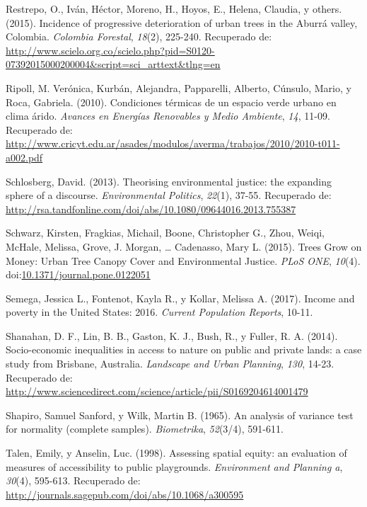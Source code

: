 \documentclass[12pt,a4paper,openany]{book}
\theoremstyle{definition}
\theoremstyle{definition}
\theoremstyle{definition}
\theoremstyle{remark}
\begin{document}
\hypertarget{ref-restrepo_incidence_2015}{}
Restrepo, O., Iván, Héctor, Moreno, H., Hoyos, E., Helena, Claudia, y
others. (2015). Incidence of progressive deterioration of urban trees in
the Aburrá valley, Colombia. \emph{Colombia Forestal}, \emph{18}(2),
225-240. Recuperado de:
\url{http://www.scielo.org.co/scielo.php?pid=S0120-07392015000200004\&script=sci_arttext\&tlng=en}

\hypertarget{ref-ripoll_condiciones_2010}{}
Ripoll, M. Verónica, Kurbán, Alejandra, Papparelli, Alberto, Cúnsulo,
Mario, y Roca, Gabriela. (2010). Condiciones térmicas de un espacio
verde urbano en clima árido. \emph{Avances en Energías Renovables y
Medio Ambiente}, \emph{14}, 11-09. Recuperado de:
\url{http://www.cricyt.edu.ar/asades/modulos/averma/trabajos/2010/2010-t011-a002.pdf}

\hypertarget{ref-schlosberg_theorising_2013}{}
Schlosberg, David. (2013). Theorising environmental justice: the
expanding sphere of a discourse. \emph{Environmental Politics},
\emph{22}(1), 37-55. Recuperado de:
\url{http://rsa.tandfonline.com/doi/abs/10.1080/09644016.2013.755387}

\hypertarget{ref-schwarz_trees_2015}{}
Schwarz, Kirsten, Fragkias, Michail, Boone, Christopher G., Zhou, Weiqi,
McHale, Melissa, Grove, J. Morgan, \ldots{} Cadenasso, Mary L. (2015).
Trees Grow on Money: Urban Tree Canopy Cover and Environmental Justice.
\emph{PLoS ONE}, \emph{10}(4).
doi:\href{https://doi.org/10.1371/journal.pone.0122051}{10.1371/journal.pone.0122051}

\hypertarget{ref-semega2017income}{}
Semega, Jessica L., Fontenot, Kayla R., y Kollar, Melissa A. (2017).
Income and poverty in the United States: 2016. \emph{Current Population
Reports}, 10-11.

\hypertarget{ref-shanahan_socio-economic_2014}{}
Shanahan, D. F., Lin, B. B., Gaston, K. J., Bush, R., y Fuller, R. A.
(2014). Socio-economic inequalities in access to nature on public and
private lands: a case study from Brisbane, Australia. \emph{Landscape
and Urban Planning}, \emph{130}, 14-23. Recuperado de:
\url{http://www.sciencedirect.com/science/article/pii/S0169204614001479}

\hypertarget{ref-shapiro1965analysis}{}
Shapiro, Samuel Sanford, y Wilk, Martin B. (1965). An analysis of
variance test for normality (complete samples). \emph{Biometrika},
\emph{52}(3/4), 591-611.

\hypertarget{ref-talen_assessing_1998}{}
Talen, Emily, y Anselin, Luc. (1998). Assessing spatial equity: an
evaluation of measures of accessibility to public playgrounds.
\emph{Environment and Planning a}, \emph{30}(4), 595-613. Recuperado de:
\url{http://journals.sagepub.com/doi/abs/10.1068/a300595}
\end{document}
